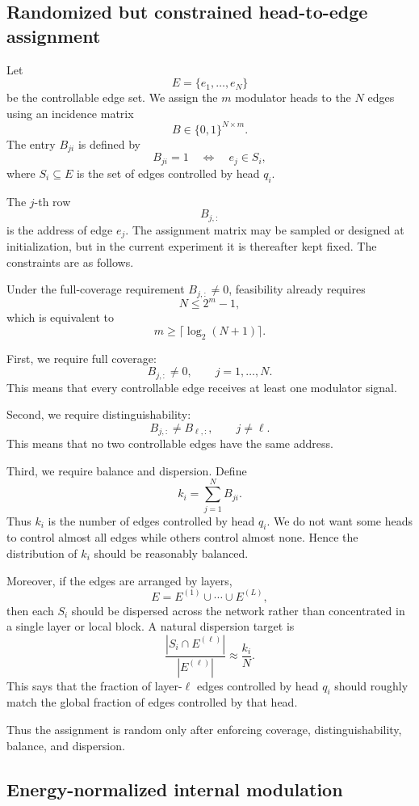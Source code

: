\documentclass[11pt]{article}
\newcommand{\1}{\mathbf{1}}
\begin{document}
\subsection{Randomized but constrained head-to-edge assignment}

Let
\[
E=\{e_1,\dots,e_N\}
\]
be the controllable edge set. We assign the \(m\) modulator heads to the \(N\) edges using an incidence matrix
\[
B\in\{0,1\}^{N\times m}.
\]
The entry \(B_{ji}\) is defined by
\[
B_{ji}=1
\quad\Longleftrightarrow\quad
e_j\in S_i,
\]
where \(S_i\subseteq E\) is the set of edges controlled by head \(q_i\).

The \(j\)-th row
\[
B_{j,:}
\]
is the address of edge \(e_j\). The assignment matrix may be sampled or designed at initialization, but in the current experiment it is thereafter kept fixed. The constraints are as follows.

Under the full-coverage requirement \(B_{j,:}\neq 0\), feasibility already requires
\[
N\le 2^m-1,
\]
which is equivalent to
\[
m\ge \lceil \log_2(N+1)\rceil.
\]

First, we require full coverage:
\[
B_{j,:}\neq 0,
\qquad
j=1,\dots,N.
\]
This means that every controllable edge receives at least one modulator signal.

Second, we require distinguishability:
\[
B_{j,:}\neq B_{\ell,:},
\qquad
j\neq \ell.
\]
This means that no two controllable edges have the same address.

Third, we require balance and dispersion. Define
\[
k_i=\sum_{j=1}^N B_{ji}.
\]
Thus \(k_i\) is the number of edges controlled by head \(q_i\). We do not want some heads to control almost all edges while others control almost none. Hence the distribution of \(k_i\) should be reasonably balanced.

Moreover, if the edges are arranged by layers,
\[
E=E^{(1)}\cup\cdots\cup E^{(L)},
\]
then each \(S_i\) should be dispersed across the network rather than concentrated in a single layer or local block. A natural dispersion target is
\[
\frac{|S_i\cap E^{(\ell)}|}{|E^{(\ell)}|}
\approx
\frac{k_i}{N}.
\]
This says that the fraction of layer-\(\ell\) edges controlled by head \(q_i\) should roughly match the global fraction of edges controlled by that head.

Thus the assignment is random only after enforcing coverage, distinguishability, balance, and dispersion.

\subsection{Energy-normalized internal modulation}
\end{document}

